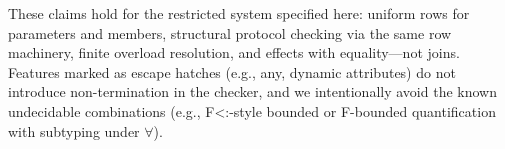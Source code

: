 These claims hold for the restricted system specified here: uniform rows for parameters and members, structural protocol checking via the same row machinery, finite overload resolution, and effects with equality—not joins. Features marked as escape hatches (e.g., any, dynamic attributes) do not introduce non-termination in the checker, and we intentionally avoid the known undecidable combinations (e.g., F<:-style bounded or F-bounded quantification with subtyping under $\forall$).

